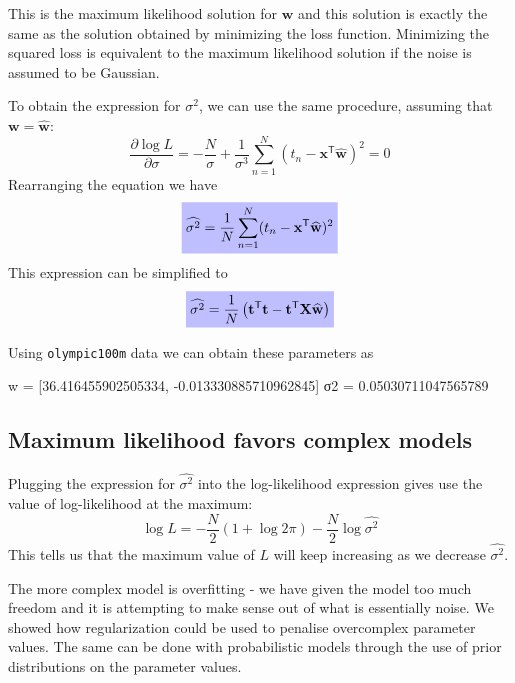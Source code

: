 \documentclass[a4paper,11pt]{article} %
\newcommand{\txtinline}[1]{\texttt{#1}}
\newcommand{\highlighteq}[1]{\colorbox{blue!25}{$\displaystyle#1$}}
\begin{document}
This is the maximum likelihood solution for $\mathbf{w}$ and this solution is exactly
the same as the solution obtained by minimizing the loss function.
Minimizing the squared loss is equivalent
to the maximum likelihood solution if the noise is assumed to be Gaussian.

To obtain the expression for $\sigma^2$, we can use the same procedure,
assuming that $\mathbf{w} = \widehat{\mathbf{w}}$:
\begin{equation}
\frac{\partial \log L}{\partial \sigma} = -\frac{N}{\sigma} +
\frac{1}{\sigma^3}\sum_{n=1}^{N} (t_{n} - \mathbf{x}^{\mathsf{T}}\widehat{\mathbf{w}})^2 = 0
\end{equation}
Rearranging the equation we have
\begin{equation}
\highlighteq{
\widehat{\sigma^2} = \frac{1}{N}\sum_{n=1}^{N} (t_n - \mathbf{x}^{\mathsf{T}}\widehat{\mathbf{w}})^2
}
\end{equation}
This expression can be simplified to
\begin{equation}
\highlighteq{
\widehat{\sigma^2} = \frac{1}{N}\left(
\mathbf{t}^{\mathsf{T}}\mathbf{t} - \mathbf{t}^{\mathsf{T}}\mathbf{X}\widehat{\mathbf{w}}
\right)
}
\end{equation}

Using \txtinline{olympic100m} data we can obtain these parameters as
\begin{textcode}
w = [36.416455902505334, -0.013330885710962845]
σ2 = 0.05030711047565789
\end{textcode}

\subsection{Maximum likelihood favors complex models}

Plugging the expression for $\widehat{\sigma^2}$ into the log-likelihood
expression gives use the value of log-likelihood at the maximum:
\begin{equation}
\log L = -\frac{N}{2}(1 + \log 2\pi) - \frac{N}{2}\log\widehat{\sigma^2}
\end{equation}
This tells us that the maximum value of $L$ will keep increasing as
we decrease $\widehat{\sigma^2}$.

The more complex model is overfitting - we have given the model too
much freedom and it is attempting to make sense out of what is essentially noise.
We showed how regularization could be used to penalise overcomplex
parameter values. The same can be done with probabilistic models through the use
of prior distributions on the parameter values.
\end{document}
